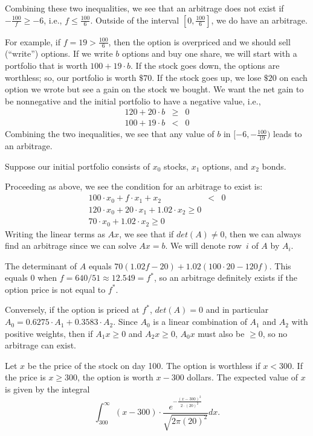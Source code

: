Combining these two inequalities, we see that an arbitrage does not exist
if $-\frac{100}{f} \geq -6$, i.e., $f \leq \frac{100}{6}$. Outside of the
interval $[0,\frac{100}{6}]$, we do have an arbitrage.

For example, if $f=19 > \frac{100}{6}$, then the option is overpriced and 
we should sell (``write'') options.  If we write $b$ options and buy one share,
we will start with a portfolio that is worth  $100 + 19\cdot b$.
If the stock goes down, the options are worthless; so, our portfolio
is worth $\$70$. If the stock goes up, we lose $\$20$ on 
each option we wrote but see a gain on the stock we bought. We want
the net gain to be nonnegative and the initial
portfolio to have a negative value, i.e., 
\begin{eqnarray*}
120 + 20 \cdot b & \geq & 0 \\
100 + 19 \cdot b  & < & 0
\end{eqnarray*}
Combining the two inequalities, we see that any value of $b$ in $[-6,-\frac{100}{19})$
leads to an arbitrage.

Suppose our initial portfolio consists of $x_0$ stocks, $x_1$ options, and $x_2$
bonds.

Proceeding as above, we see the condition for an arbitrage to exist
is:
\begin{eqnarray*}
100 \cdot x_0 + f \cdot x_1 + x_2 & < & 0 \\
120 \cdot x_0 + 20 \cdot x_1 + 1.02 \cdot x_2 \geq 0 \\
70 \cdot x_0 + 1.02 \cdot x_2 \geq 0 
\end{eqnarray*}
Writing the linear terms as $Ax$, we see that 
if $det(A) \neq 0$, then we can always find an arbitrage since we
can solve $Ax = b$. We will denote row~$i$ of $A$ by $A_i$.

The determinant of $A$ equals $70(1.02f - 20) + 1.02(100\cdot20 - 120f)$.
This equals $0$ when $f = 640/51 \approx 12.549 = f^\ast$, so an arbitrage
definitely exists if the option price is not equal to $f^\ast$.

Conversely, if the option is priced at $f^\ast$, $det(A) = 0$ and
in particular $A_0 = 0.6275 \cdot A_1 + 0.3583 \cdot A_2$.
Since $A_0$ is a linear combination of 
$A_1$ and $A_2$ with positive weights, then
if $A_1 x\geq 0$ and $A_2 x \geq 0$, $A_0x$ must also be $\geq 0$, so
no arbitrage can exist.

Let $x$ be the price of the stock on day 100. The option is worthless if $x < 300$.  
If the price is $x \geq 300$, the option is worth $x -300$ dollars.
The expected value of $x$ is given by the integral
\[
\int_{300}^{\infty} (x-300) \cdot \frac{e^{-\frac{(x-300)^2}{2\cdot (20)^2}}}{\sqrt{2 \pi (20)^2}} dx .
\]

